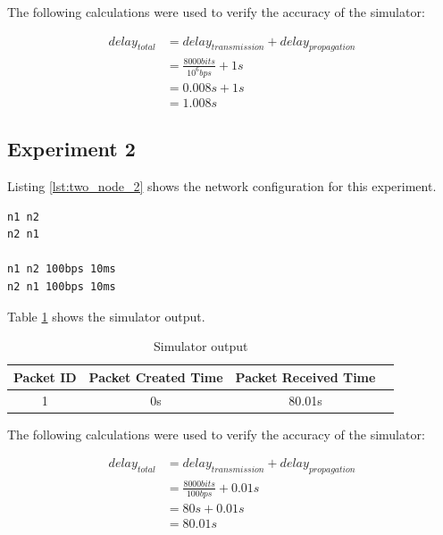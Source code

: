 \documentclass[fleqn,11pt]{article}
\begin{document}
\noindent
The following calculations were used to verify the accuracy of the simulator:

\begin{align*}
  delay_{total} &= delay_{transmission} + delay_{propagation}\\
  &= \frac{8000bits}{10^6bps} + 1s\\
  &= 0.008s + 1s\\
  &= 1.008s
\end{align*}

\subsection{Experiment 2}
\vspace{0.5cm}

Listing \ref{lst:two_node_2} shows the network configuration for this experiment.

\vspace{0.5cm}
\begin{lstlisting}[caption={Network configuration},label={lst:two_node_2}]
n1 n2
n2 n1

n1 n2 100bps 10ms
n2 n1 100bps 10ms
\end{lstlisting}
\vspace{0.5cm}

\noindent
Table \ref{tab:two_node_2} shows the simulator output.

\begin{table}[h]
  \caption{Simulator output}
  \label{tab:two_node_2}
  \begin{center}
    \begin{tabular}{cccc}
      \toprule
      Packet ID & Packet Created Time & Packet Received Time & \\
      \midrule
      1 & 0s & 80.01s\\
      \bottomrule
    \end{tabular}
  \end{center}
\end{table}
\vspace{0.5cm}

\noindent
The following calculations were used to verify the accuracy of the simulator:

\begin{align*}
  delay_{total} &= delay_{transmission} + delay_{propagation}\\
  &= \frac{8000bits}{100bps} + 0.01s\\
  &= 80s + 0.01s\\
  &= 80.01s
\end{align*}
\end{document}
